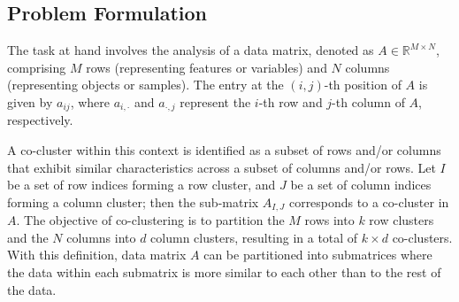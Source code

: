 


\subsection{Problem Formulation}
The task at hand involves the analysis of a data matrix, denoted as $A \in \mathbb{R}^{M \times N}$, comprising $M$ rows (representing features or variables) and $N$ columns (representing objects or samples). The entry at the $(i, j)$-th position of $A$ is given by $a_{ij}$, where $a_{i,\cdot}$ and $a_{\cdot,j}$ represent the $i$-th row and $j$-th column of $A$, respectively. 

A co-cluster within this context is identified as a subset of rows and/or columns that exhibit similar characteristics across a subset of columns and/or rows. Let $I$ be a set of row indices forming a row cluster, and $J$ be a set of column indices forming a column cluster; then the sub-matrix $A_{I,J}$ corresponds to a co-cluster in $A$. The objective of co-clustering is to partition the $M$ rows into $k$ row clusters and the $N$ columns into $d$ column clusters, resulting in a total of $k \times d$ co-clusters. With this definition, data matrix $A$ can be partitioned into submatrices where the data within each submatrix is more similar to each other than to the rest of the data.

